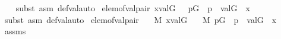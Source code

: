\begin{isabellebody}
%
\isadelimproof
\ \ %
\endisadelimproof
%
\isatagproof
{}\isamarkupfalse%
\ {\isacharparenleft}{\kern0pt}subst\ {\isacharparenleft}{\kern0pt}asm{\isacharparenright}{\kern0pt}\ def{\isacharunderscore}{\kern0pt}val{\isacharcomma}{\kern0pt}auto{\isacharparenright}{\kern0pt}%
\endisatagproof
{\isafoldproof}%
%
\isadelimproof
\isanewline
%
\endisadelimproof
\isanewline
{}\isamarkupfalse%
\ elem{\isacharunderscore}{\kern0pt}of{\isacharunderscore}{\kern0pt}val{\isacharunderscore}{\kern0pt}pair{\isacharcolon}{\kern0pt}\ {\isachardoublequoteopen}x{\isasymin}val{\isacharparenleft}{\kern0pt}G{\isacharcomma}{\kern0pt}{\isasympi}{\isacharparenright}{\kern0pt}\ {\isasymLongrightarrow}\ {\isasymexists}{\isasymtheta}{\isachardot}{\kern0pt}\ {\isasymexists}p{\isasymin}G{\isachardot}{\kern0pt}\ \ {\isasymlangle}{\isasymtheta}{\isacharcomma}{\kern0pt}p{\isasymrangle}{\isasymin}{\isasympi}\ {\isasymand}\ val{\isacharparenleft}{\kern0pt}G{\isacharcomma}{\kern0pt}{\isasymtheta}{\isacharparenright}{\kern0pt}\ {\isacharequal}{\kern0pt}\ x{\isachardoublequoteclose}\isanewline
%
\isadelimproof
\ \ %
\endisadelimproof
%
\isatagproof
{}\isamarkupfalse%
\ {\isacharparenleft}{\kern0pt}subst\ {\isacharparenleft}{\kern0pt}asm{\isacharparenright}{\kern0pt}\ def{\isacharunderscore}{\kern0pt}val{\isacharcomma}{\kern0pt}auto{\isacharparenright}{\kern0pt}%
\endisatagproof
{\isafoldproof}%
%
\isadelimproof
\isanewline
%
\endisadelimproof
\isanewline
{}\isamarkupfalse%
\ elem{\isacharunderscore}{\kern0pt}of{\isacharunderscore}{\kern0pt}val{\isacharunderscore}{\kern0pt}pair{\isacharprime}{\kern0pt}{\isacharcolon}{\kern0pt}\isanewline
\ \ \ {\isachardoublequoteopen}{\isasympi}{\isasymin}M{\isachardoublequoteclose}\ {\isachardoublequoteopen}x{\isasymin}val{\isacharparenleft}{\kern0pt}G{\isacharcomma}{\kern0pt}{\isasympi}{\isacharparenright}{\kern0pt}{\isachardoublequoteclose}\isanewline
\ \ \ {\isachardoublequoteopen}{\isasymexists}{\isasymtheta}{\isasymin}M{\isachardot}{\kern0pt}\ {\isasymexists}p{\isasymin}G{\isachardot}{\kern0pt}\ \ {\isasymlangle}{\isasymtheta}{\isacharcomma}{\kern0pt}p{\isasymrangle}{\isasymin}{\isasympi}\ {\isasymand}\ val{\isacharparenleft}{\kern0pt}G{\isacharcomma}{\kern0pt}{\isasymtheta}{\isacharparenright}{\kern0pt}\ {\isacharequal}{\kern0pt}\ x{\isachardoublequoteclose}\isanewline
%
\isadelimproof
%
\endisadelimproof
%
\isatagproof
{}\isamarkupfalse%
\ {\isacharminus}{\kern0pt}\isanewline
\ \ \isamarkupfalse%
\ assms\isanewline
\ \ \isamarkupfalse%

\end{isabellebody}

